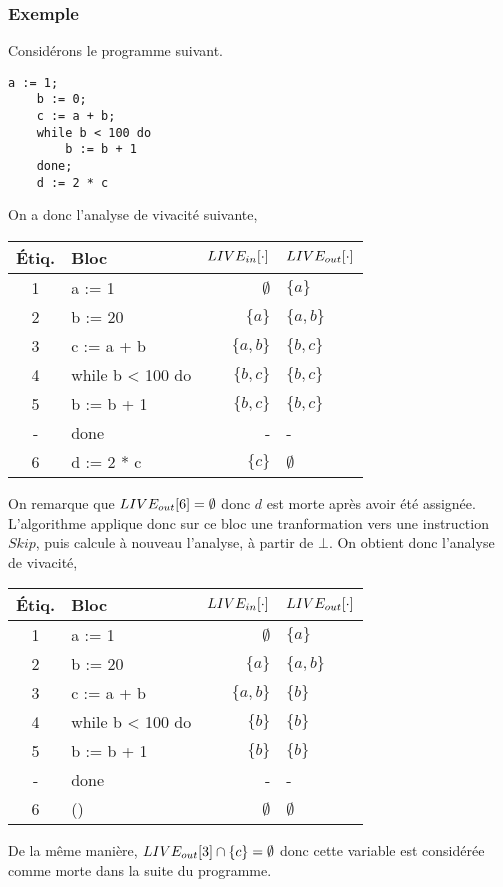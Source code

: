 \documentclass[a4paper, 12pt]{article}
\begin{document}
\subsubsection{Exemple}
\noindent
Considérons le programme suivant.
\begin{lstlisting}[tabsize=2]
	a := 1;
	b := 0;
	c := a + b;
	while b < 100 do
		b := b + 1
	done;
	d := 2 * c
\end{lstlisting}
On a donc l'analyse de vivacité suivante,
\begin{center}
\begin{tabular}{||c|l|r|l||}
\hline
Étiq. & Bloc & $LIVE_{in}[\cdot]$ & $LIVE_{out}[\cdot]$ \\
\hline
1 & a := 1 & $\emptyset$ & $\{a\}$\\
2 & b := 20 & $\{a\}$ & $\{a, b\}$\\
3 & c := a + b & $\{a, b\}$ & $\{b, c\}$\\
4 & while b < 100 do & $\{b, c\}$ & $\{b, c\}$\\
5 & b := b + 1 & $\{b, c\}$ & $\{b, c\}$\\
- & done & - & -\\
6 & d := 2 * c & $\{c\}$ & $\emptyset$\\
\hline
\end{tabular}
\end{center}
On remarque que $LIVE_{out}[6] = \emptyset$ donc $d$ est morte après avoir été assignée. L'algorithme applique donc sur ce bloc
une tranformation vers une instruction $Skip$, puis calcule à nouveau l'analyse, à partir de $\bot$. On obtient donc l'analyse
de vivacité,
\begin{center}
	\begin{tabular}{||c|l|r|l||}
	\hline
	Étiq. & Bloc & $LIVE_{in}[\cdot]$ & $LIVE_{out}[\cdot]$ \\
	\hline
	1 & a := 1 & $\emptyset$ & $\{a\}$\\
	2 & b := 20 & $\{a\}$ & $\{a, b\}$\\
	3 & c := a + b & $\{a, b\}$ & $\{b\}$\\
	4 & while b < 100 do & $\{b\}$ & $\{b\}$\\
	5 & b := b + 1 & $\{b\}$ & $\{b\}$\\
	- & done & - & -\\
	6 & () & $\emptyset$ & $\emptyset$\\
	\hline
	\end{tabular}
\end{center}
De la même manière, $LIVE_{out}[3] \cap \{c\} = \emptyset$ donc cette variable est considérée comme morte dans la suite du programme.
\end{document}
